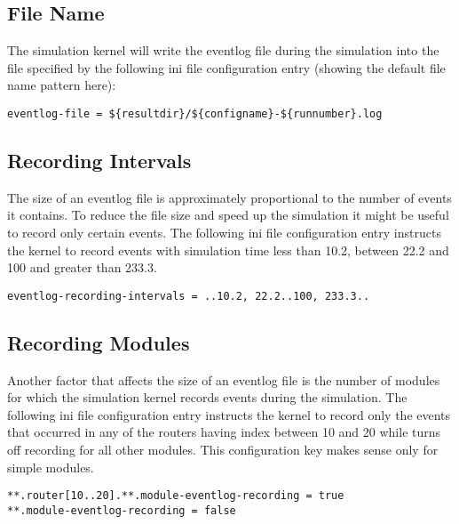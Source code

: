 \subsection{File Name}
The simulation kernel will write the eventlog file during the
simulation into the file specified by the following ini file
configuration entry (showing the default file name pattern here):
\begin{verbatim}
eventlog-file = ${resultdir}/${configname}-${runnumber}.log
\end{verbatim}

\subsection{Recording Intervals}
The size of an eventlog file is approximately proportional to the
number of events it contains. To reduce the file size and speed up the
simulation it might be useful to record only certain events. The
following ini file configuration entry instructs the kernel to record
events with simulation time less than 10.2, between 22.2 and 100 and
greater than 233.3.
\begin{verbatim}
eventlog-recording-intervals = ..10.2, 22.2..100, 233.3..
\end{verbatim}

\subsection{Recording Modules}
Another factor that affects the size of an eventlog file is the number
of modules for which the simulation kernel records events during the
simulation. The following ini file configuration entry instructs the
kernel to record only the events that occurred in any of the routers
having index between 10 and 20 while turns off recording for all other
modules. This configuration key makes sense only for simple modules.
\begin{verbatim}
**.router[10..20].**.module-eventlog-recording = true
**.module-eventlog-recording = false
\end{verbatim}

